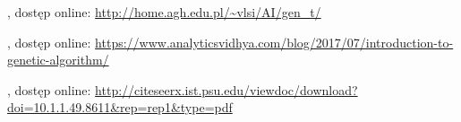 \documentclass[twoside,twocolumn]{article}
\begin{document}
\begin{thebibliography}{99} %

, dostęp online:
\newblock \url{http://home.agh.edu.pl/~vlsi/AI/gen_t/}
 
, dostęp online:
\newblock \url{https://www.analyticsvidhya.com/blog/2017/07/introduction-to-genetic-algorithm/} 

, dostęp online:
\newblock \url{http://citeseerx.ist.psu.edu/viewdoc/download?doi=10.1.1.49.8611&rep=rep1&type=pdf} 
\end{thebibliography}

\end{document}
